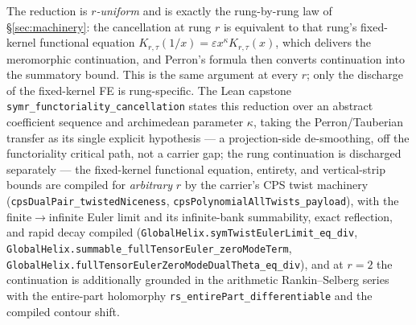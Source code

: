 \documentclass[11pt]{article}
\theoremstyle{definition}
\begin{document}
The reduction is \emph{$r$-uniform} and is exactly the rung-by-rung law of
\S\ref{sec:machinery}: the cancellation at rung $r$ is equivalent to that rung's fixed-kernel
functional equation $K_{r,\tau}(1/x)=\varepsilon x^{\kappa}K_{r,\tau}(x)$, which delivers the
meromorphic continuation, and Perron's formula then converts continuation into the summatory
bound. This is the same argument at every $r$; only the discharge of the fixed-kernel FE is
rung-specific. The Lean capstone \texttt{symr\_functoriality\_cancellation} states this reduction
over an abstract coefficient sequence and archimedean parameter $\kappa$, taking the
Perron/Tauberian transfer as its single explicit hypothesis --- a projection-side de-smoothing, off
the functoriality critical path, not a carrier gap; the rung continuation is discharged
separately --- the fixed-kernel functional equation, entirety, and vertical-strip bounds are
compiled for \emph{arbitrary} $r$ by the carrier's CPS twist machinery
(\texttt{cpsDualPair\_twistedNiceness}, \texttt{cpsPolynomialAllTwists\_payload}), with the
finite$\to$infinite Euler limit and its infinite-bank summability, exact reflection, and rapid decay
compiled (\texttt{GlobalHelix.symTwistEulerLimit\_eq\_div},
\texttt{GlobalHelix.summable\_fullTensorEuler\_zeroModeTerm},
\texttt{GlobalHelix.fullTensorEulerZeroModeDualTheta\_eq\_div}), and at $r=2$ the
continuation is additionally grounded in the arithmetic Rankin--Selberg series with the entire-part
holomorphy \texttt{rs\_entirePart\_differentiable} and the compiled contour shift.
\end{document}
